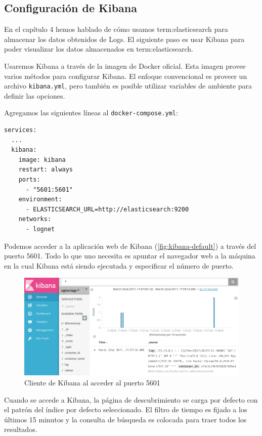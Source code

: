\subsection{Configuración de Kibana}
\label{configuracion-de-kibana}

En el capítulo 4 hemos hablado de cómo usamos \gls{term:elasticsearch} para almacenar los datos obtenidos de Logs. El siguiente paso es usar Kibana para poder visualizar los datos almacenados en \gls{term:elasticsearch}.

Usaremos Kibana a través de la imagen de Docker oficial. Esta imagen provee varios métodos para configurar Kibana. El enfoque convencional es proveer un archivo \lstinline{kibana.yml}, pero también es posible utilizar variables de ambiente para definir las opciones.

Agregamos las siguientes líneas al \lstinline{docker-compose.yml}:

\begin{lstlisting}
services:
  ...
  kibana:
    image: kibana
    restart: always
    ports:
      - "5601:5601"
    environment:
      - ELASTICSEARCH_URL=http://elasticsearch:9200
    networks:
      - lognet
\end{lstlisting}

Podemos acceder a la aplicación web de Kibana (\autoref{fig:kibana-default}) a través del puerto 5601. Todo lo que uno necesita es apuntar el navegador web a la máquina en la cual Kibana está siendo ejecutada y especificar el número de puerto. 

\begin{figure}
  \includegraphics[width=\linewidth]{src/images/05-capitulo-5/kibanadefault.jpg}
  \caption{Cliente de Kibana al acceder al puerto 5601}
  \label{fig:kibana-default}
\end{figure}

Cuando se accede a Kibana, la página de descubrimiento se carga por defecto con el patrón del índice por defecto seleccionado. El filtro de tiempo es fijado a los últimos 15 minutos y la consulta de búsqueda es colocada para traer todos los resultados.

